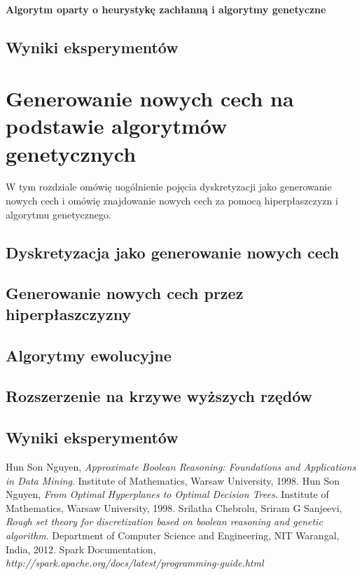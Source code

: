 \documentclass[magisterska]{pracamgr}
\theoremstyle{plain}
\theoremstyle{definition}
\theoremstyle{remark}
\begin{document}
\subsubsection{Algorytm oparty o heurystykę zachłanną i algorytmy genetyczne}
\section{Wyniki eksperymentów}


\chapter{Generowanie nowych cech na podstawie algorytmów genetycznych}

W tym rozdziale omówię uogólnienie pojęcia dyskretyzacji jako generowanie nowych cech i omówię
znajdowanie nowych cech za pomocą hiperpłaszczyzn i algorytmu genetycznego.

\section{Dyskretyzacja jako generowanie nowych cech}
\section{Generowanie nowych cech przez hiperpłaszczyzny}
\section{Algorytmy ewolucyjne}
\section{Rozszerzenie na krzywe wyższych rzędów}
\section{Wyniki eksperymentów}

\begin{thebibliography}{9}

  Hun Son Nguyen,
  \emph{Approximate Boolean Reasoning: Foundations and Applications in Data Mining}.
  Institute of Mathematics, Warsaw University,
  1998.
  Hun Son Nguyen,
  \emph{From Optimal Hyperplanes to Optimal Decision Trees}.
  Institute of Mathematics, Warsaw University,
  1998.
  Srilatha Chebrolu, Sriram G Sanjeevi,
  \emph{Rough set theory for discretization based on boolean reasoning and 
  genetic algorithm}.
  Department of Computer Science and Engineering, NIT Warangal, India,
  2012.
 Spark Documentation,
 \emph{http://spark.apache.org/docs/latest/programming-guide.html}

\end{thebibliography}
 
\end{document}
